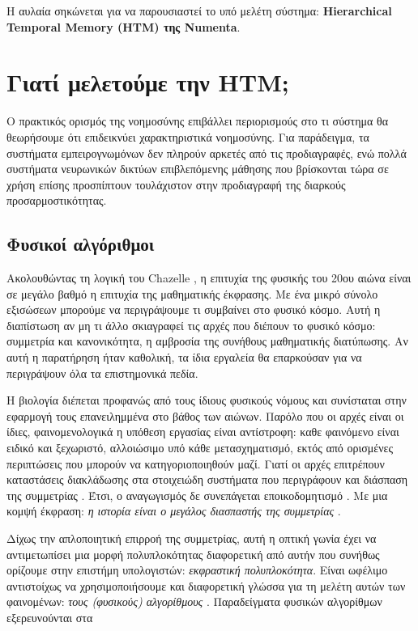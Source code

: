   Η αυλαία σηκώνεται για να παρουσιαστεί το υπό μελέτη σύστημα: \textbf{Hierarchical Temporal Memory (HTM) της Numenta}.

\section{Γιατί μελετούμε την HTM;}

  Ο πρακτικός ορισμός της νοημοσύνης επιβάλλει περιορισμούς στο τι σύστημα θα θεωρήσουμε ότι επιδεικνύει χαρακτηριστικά νοημοσύνης.
  Για παράδειγμα, τα συστήματα εμπειρογνωμόνων δεν πληρούν αρκετές από τις προδιαγραφές, ενώ πολλά συστήματα νευρωνικών
  δικτύων επιβλεπόμενης μάθησης που βρίσκονται τώρα σε χρήση επίσης προσπίπτουν τουλάχιστον στην προδιαγραφή της διαρκούς προσαρμοστικότητας.

\subsection{Φυσικοί αλγόριθμοι}

  Ακολουθώντας τη λογική του Chazelle \cite{chazelleNaturalAlgorithmsInfluence}, η επιτυχία της φυσικής του 20ου αιώνα είναι σε μεγάλο βαθμό η επιτυχία της μαθηματικής έκφρασης.
  Με ένα μικρό σύνολο εξισώσεων μπορούμε να περιγράψουμε τι συμβαίνει στο φυσικό κόσμο.
  Αυτή η διαπίστωση αν μη τι άλλο σκιαγραφεί τις αρχές που διέπουν το φυσικό κόσμο:
  συμμετρία και κανονικότητα, η αμβροσία της συνήθους μαθηματικής διατύπωσης.
  Αν αυτή η παρατήρηση ήταν καθολική, τα ίδια εργαλεία θα επαρκούσαν για να περιγράψουν όλα τα επιστημονικά πεδία.

  Η βιολογία διέπεται προφανώς από τους ίδιους φυσικούς νόμους και συνίσταται στην εφαρμογή τους επανειλημμένα στο βάθος των αιώνων.
  Παρόλο που οι αρχές είναι οι ίδιες, φαινομενολογικά η υπόθεση εργασίας είναι αντίστροφη:
  καθε φαινόμενο είναι ειδικό και ξεχωριστό, αλλοιώσιμο υπό κάθε μετασχηματισμό, εκτός από ορισμένες περιπτώσεις που μπορούν να κατηγοριοποιηθούν μαζί.
  Γιατί οι αρχές επιτρέπουν καταστάσεις διακλάδωσης στα στοιχειώδη συστήματα που περιγράφουν και διάσπαση της συμμετρίας \parencite{bradingSymmetrySymmetryBreaking2017}.
  Έτσι, ο αναγωγισμός δε συνεπάγεται εποικοδομητισμό \parencite{andersonMoreDifferent1972}.
  Με μια κομψή έκφραση: \textit{η ιστορία είναι ο μεγάλος διασπαστής της συμμετρίας} \parencite{chazelleNaturalAlgorithmsInfluence}.

  Δίχως την απλοποιητική επιρροή της συμμετρίας, αυτή η οπτική γωνία έχει να αντιμετωπίσει μια μορφή πολυπλοκότητας διαφορετική
  από αυτήν που συνήθως ορίζουμε στην επιστήμη υπολογιστών: \textit{εκφραστική πολυπλοκότητα}.
  Είναι ωφέλιμο αντιστοίχως να χρησιμοποιήσουμε και διαφορετική γλώσσα για τη μελέτη
  αυτών των φαινομένων: \textit{τους (φυσικούς) αλγορίθμους} \parencite{chazelleNaturalAlgorithmsInfluence}.
  Παραδείγματα φυσικών αλγορίθμων εξερευνούνται στα \cite{patonComputationCellsTissues2013,adamatzkyAdvancesPhysarumMachines2016}
  \medskip

